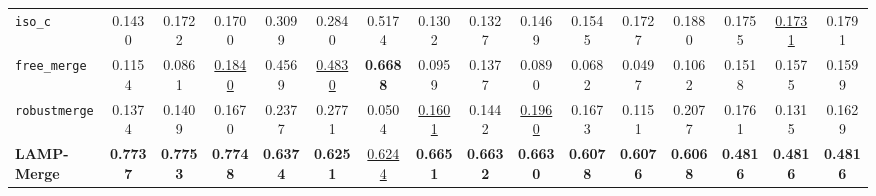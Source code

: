 \documentclass[letterpaper]{article} %
\begin{document}
\begin{table}[t]
{\begin{tabular}{lccccccccccccccc}
\texttt{iso\_c} & 0.1430 & 0.1722 & 0.1700 & 0.3099 & 0.2840 & 0.5174 & 0.1302 & 0.1327 & 0.1469 & 0.1545 & 0.1727 & 0.1880 & 0.1755 & \underline{0.1731} & 0.1791 \\
\texttt{free\_merge} & 0.1154 & 0.0861 & \underline{0.1840} & 0.4569 & \underline{0.4830} & \textbf{0.6688} & 0.0959 & 0.1377 & 0.0890 & 0.0682 & 0.0497 & 0.1062 & 0.1518 & 0.1575 & 0.1599 \\
\texttt{robustmerge} & 0.1374 & 0.1409 & 0.1670 & 0.2377 & 0.2771 & 0.0504 & \underline{0.1601} & 0.1442 & \underline{0.1960} & 0.1673 & 0.1151 & 0.2077 & 0.1761 & 0.1315 & 0.1629 \\
\textbf{LAMP-Merge} & \textbf{0.7737} & \textbf{0.7753} & \textbf{0.7748} & \textbf{0.6374} & \textbf{0.6251} & \underline{0.6244} & \textbf{0.6651} & \textbf{0.6632} & \textbf{0.6630} & \textbf{0.6078} & \textbf{0.6076} & \textbf{0.6068} & \textbf{0.4816} & \textbf{0.4816} & \textbf{0.4816} \\
\hline
\end{tabular}
}
\end{table}
\end{document}

